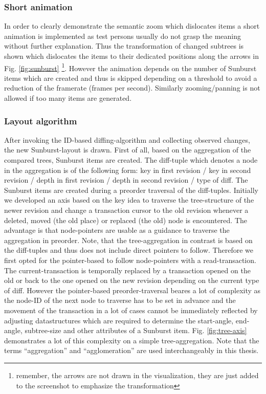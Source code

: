 \subsubsection{Short animation}
In order to clearly demonstrate the semantic zoom which dislocates items a short animation is implemented as test persons usually do not grasp the meaning without further explanation. Thus the transformation of changed subtrees is shown which dislocates the items to their dedicated positions along the arrows in Fig. \ref{fig:sunburst} \footnote{remember, the arrows are not drawn in the visualization, they are just added to the screenshot to emphasize the transformation}. However the animation depends on the number of Sunburst items which are created and thus is skipped depending on a threshold to avoid a reduction of the framerate (frames per second). Similarly zooming/panning is not allowed if too many items are generated.

\subsubsection{Layout algorithm}
After invoking the ID-based diffing-algorithm and collecting observed changes, the new Sunburst-layout is drawn. First of all, based on the aggregation of the compared trees, Sunburst items are created. The diff-tuple which denotes a node in the aggregation is of the following form: key in first revision / key in second revision / depth in first revision / depth in second revision / type of diff. The Sunburst items are created during a preorder traversal of the diff-tuples. Initially we developed an axis based on the key idea to traverse the tree-structure of the newer revision and change a transaction cursor to the old revision whenever a deleted, moved (the old place) or replaced (the old) node is encountered. The advantage is that node-pointers are usable as a guidance to traverse the aggregation in preorder. Note, that the tree-aggregation in contrast is based on the diff-tuples and thus does not include direct pointers to follow. Therefore we first opted for the pointer-based to follow node-pointers with a read-transaction. The current-transaction is temporally replaced by a transaction opened on the old or back to the one opened on the new revision depending on the current type of diff. However the pointer-based preorder-traversal beares a lot of complexity as the node-ID of the next node to traverse has to be set in advance and the movement of the transaction in a lot of cases cannot be immediately reflected by adjusting datastructures which are required to determine the start-angle, end-angle, subtree-size and other attributes of a Sunburst item. Fig. \ref{fig:tree-axis} demonstrates a lot of this complexity on a simple tree-aggregation. Note that the terms ``aggregation'' and ``agglomeration'' are used interchangeably in this thesis. 

